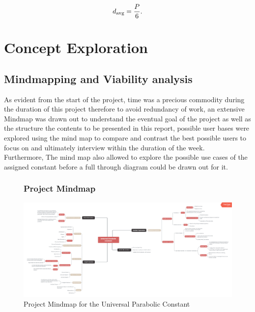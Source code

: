 \documentclass[12pt]{report}
\begin{document}
 \begin{equation}
{d_{\text{avg}}={P \over 6}.}
 \end{equation}


 



 \chapter{Concept Exploration}
 
 
 \section{Mindmapping and Viability analysis}
 
 As evident from the start of the project, time was a precious commodity during the duration of this project therefore to avoid redundancy of work, an extensive Mindmap was drawn out to understand the eventual goal of the project as well as the structure the contents to be presented in this report, possible user bases were explored using the mind map to compare and contrast the best possible users to focus on and ultimately interview within the duration of the week. \\
 
 \noindent Furthermore, The mind map also allowed to explore the possible use cases of the assigned constant before a full through diagram could be drawn out for it.

  \begin{figure}
    \subsection{Project Mindmap}
     \centering
     \includegraphics[width=\textwidth]{Assets/Mindmap.png}
     \caption{Project Mindmap for the Universal Parabolic Constant}
     \label{fig:my_label}
 \end{figure}
\end{document}

